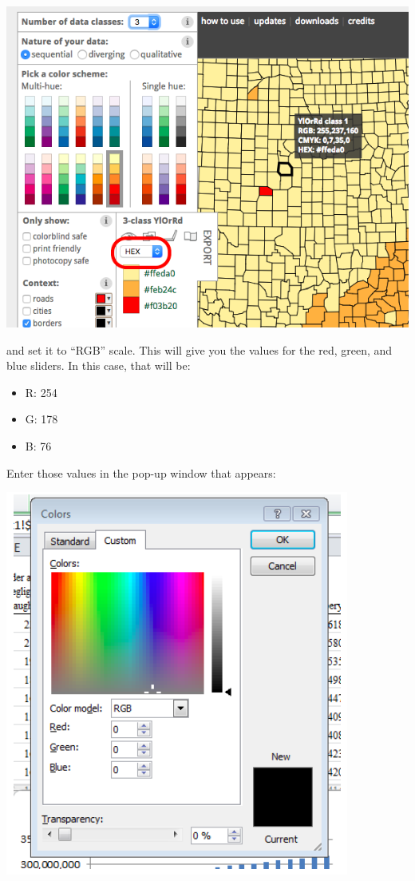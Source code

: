 \documentclass[]{book}
\providecommand{\tightlist}{%
  \setlength{\itemsep}{0pt}\setlength{\parskip}{0pt}}
\theoremstyle{definition}
\theoremstyle{definition}
\theoremstyle{definition}
\theoremstyle{remark}
\begin{document}
\includegraphics{imgs/choose_col_code.png}

and set it to ``RGB'' scale. This will give you the values for the red,
green, and blue sliders. In this case, that will be:

\begin{itemize}
\tightlist
\item
  R: 254
\item
  G: 178
\item
  B: 76
\end{itemize}

Enter those values in the pop-up window that appears:

\includegraphics{imgs/pc_rbg.png}
\end{document}
